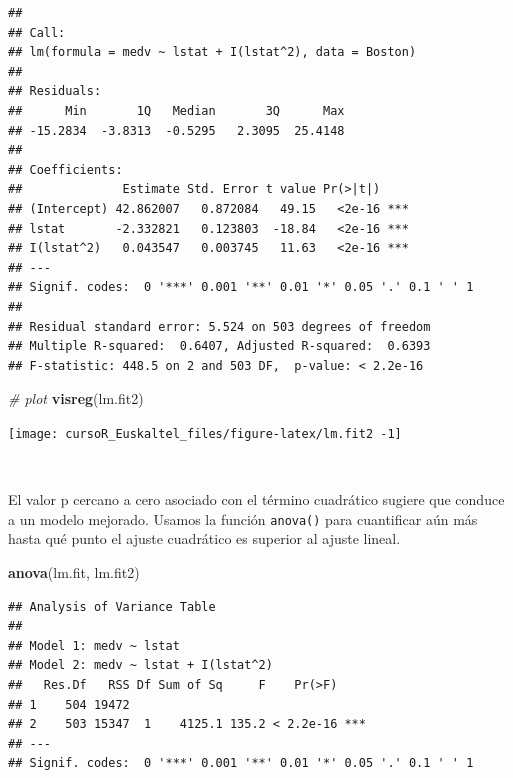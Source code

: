 \documentclass[]{book}
\newenvironment{Shaded}{\begin{snugshade}}{\end{snugshade}}
\newcommand{\KeywordTok}[1]{\textcolor[rgb]{0.13,0.29,0.53}{\textbf{#1}}}
\newcommand{\CommentTok}[1]{\textcolor[rgb]{0.56,0.35,0.01}{\textit{#1}}}
\newcommand{\NormalTok}[1]{#1}
\begin{document}
\begin{verbatim}
## 
## Call:
## lm(formula = medv ~ lstat + I(lstat^2), data = Boston)
## 
## Residuals:
##      Min       1Q   Median       3Q      Max 
## -15.2834  -3.8313  -0.5295   2.3095  25.4148 
## 
## Coefficients:
##              Estimate Std. Error t value Pr(>|t|)    
## (Intercept) 42.862007   0.872084   49.15   <2e-16 ***
## lstat       -2.332821   0.123803  -18.84   <2e-16 ***
## I(lstat^2)   0.043547   0.003745   11.63   <2e-16 ***
## ---
## Signif. codes:  0 '***' 0.001 '**' 0.01 '*' 0.05 '.' 0.1 ' ' 1
## 
## Residual standard error: 5.524 on 503 degrees of freedom
## Multiple R-squared:  0.6407, Adjusted R-squared:  0.6393 
## F-statistic: 448.5 on 2 and 503 DF,  p-value: < 2.2e-16
\end{verbatim}

\begin{Shaded}
\begin{Highlighting}[]
\CommentTok{# plot}
\KeywordTok{visreg}\NormalTok{(lm.fit2)}
\end{Highlighting}
\end{Shaded}

\begin{center}\texttt{[image: cursoR\_Euskaltel\_files/figure-latex/lm.fit2 -1]} \end{center}

~

El valor p cercano a cero asociado con el término cuadrático sugiere que
conduce a un modelo mejorado. Usamos la función \texttt{anova()} para
cuantificar aún más hasta qué punto el ajuste cuadrático es superior al
ajuste lineal.

\begin{Shaded}
\begin{Highlighting}[]
\KeywordTok{anova}\NormalTok{(lm.fit, lm.fit2)}
\end{Highlighting}
\end{Shaded}

\begin{verbatim}
## Analysis of Variance Table
## 
## Model 1: medv ~ lstat
## Model 2: medv ~ lstat + I(lstat^2)
##   Res.Df   RSS Df Sum of Sq     F    Pr(>F)    
## 1    504 19472                                 
## 2    503 15347  1    4125.1 135.2 < 2.2e-16 ***
## ---
## Signif. codes:  0 '***' 0.001 '**' 0.01 '*' 0.05 '.' 0.1 ' ' 1
\end{verbatim}

~
\end{document}
